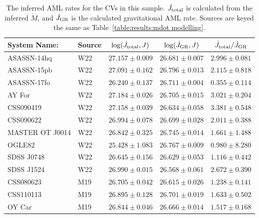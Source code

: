 \begin{table}
    \centering
    \caption{The inferred AML rates for the CVs in this sample. $\dot J_{\rm total}$ is calculated from the inferred $\dot M$, and $\dot J_{\rm GR}$ is the calculated gravitational AML rate. Sources are keyed the same as Table~\ref{table:results:mdot modelling}.}
    \label{table:results:Jdot results}
    \begin{tabular}{llccc}
        \hline
        {\bf System Name:} & \textbf{Source}  & \textbf{$\log(\dot J_{\rm total}, J)$} & \textbf{$\log(\dot J_{\rm GR}, J)$} & \textbf{$\dot J_{\rm total} / \dot J_{\rm GR}$} \\
        \hline \hline
        ASASSN-14hq     &  W22      & $27.157 \pm 0.009$    & $26.681 \pm 0.007$    & $2.996 \pm 0.081$ \\
        ASASSN-15pb     &  W22      & $27.091 \pm 0.162$    & $26.796 \pm 0.013$    & $2.115 \pm 0.818$ \\
        ASASSN-17fo     &  W22      & $26.240 \pm 0.137$    & $26.711 \pm 0.004$    & $0.355 \pm 0.114$ \\
        AY For          &  W22      & $27.184 \pm 0.026$    & $26.705 \pm 0.015$    & $3.021 \pm 0.204$ \\
        CSS090419       &  W22      & $27.158 \pm 0.039$    & $26.634 \pm 0.058$    & $3.381 \pm 0.548$ \\
        CSS090622       &  W22      & $26.994 \pm 0.078$    & $26.699 \pm 0.028$    & $2.011 \pm 0.388$ \\
        MASTER OT J0014 &  W22      & $26.842 \pm 0.325$    & $26.745 \pm 0.014$    & $1.661 \pm 1.488$ \\
        OGLE82          &  W22      & $25.428 \pm 1.083$    & $26.767 \pm 0.009$    & $0.980 \pm 8.280$ \\
        SDSS J0748      &  W22      & $26.645 \pm 0.156$    & $26.629 \pm 0.053$    & $1.116 \pm 0.442$ \\
        SDSS J1524      &  W22      & $26.990 \pm 0.015$    & $26.568 \pm 0.061$    & $2.672 \pm 0.390$ \\
        CSS080623       &  M19      & $26.705 \pm 0.042$    & $26.615 \pm 0.026$    & $1.238 \pm 0.141$ \\
        CSS110113       &  M19      & $26.895 \pm 0.128$    & $26.701 \pm 0.019$    & $1.633 \pm 0.502$ \\
        OY Car          &  M19      & $26.844 \pm 0.046$    & $26.666 \pm 0.014$    & $1.517 \pm 0.168$ \\

\end{tabular}
\end{table}

